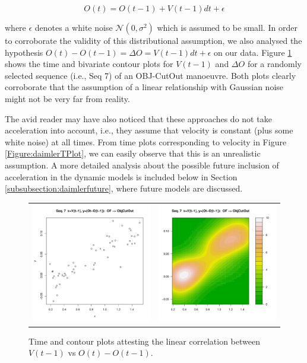 \begin{equation}
O(t) =O(t-1) +V(t-1)dt +\epsilon
\end{equation}

where $\epsilon$ denotes a white noise $\mathcal{N}(0,\sigma^2)$ which is assumed to be small. In order to corroborate the validity of this distributional assumption, we also analysed the hypothesis $O(t) - O(t-1) = \Delta O = V(t-1)dt +\epsilon$ on our data. Figure \ref{Figure:daimlerVvsOffs} shows the time and bivariate contour plots for $V(t-1)$ and $\Delta O$ for a randomly selected sequence (i.e., Seq 7) of an OBJ-CutOut manoeuvre. Both plots clearly corroborate that the assumption of a linear relationship with Gaussian noise might not be very far from reality.

The avid reader may have also noticed that these approaches do not take acceleration into account, i.e., they assume that velocity is constant (plus some white noise) at all times. From time plots corresponding to velocity in Figure \ref{Figure:daimlerTPlot}, we can easily observe that this is an unrealistic assumption. A more detailed analysis about the possible future inclusion of acceleration in the dynamic models is included below in Section \ref{subsubsection:daimlerfuture}, where future models are discussed.

\begin{figure}[ht!]
  \centering
  \setlength{\tabcolsep}{0.05pt}
  \renewcommand{\arraystretch}{0.02}
    \begin{tabular}{cc}
    \includegraphics[width=60mm]{figures/DaimlerOBJplotSerie7.pdf}&
    \includegraphics[width=60mm]{figures/DaimlerOBJcontourSerie7.pdf}\\
  \end{tabular}
      \caption{ \label{Figure:daimlerVvsOffs}Time and contour plots attesting the linear correlation between $V(t-1)$ vs $O(t) - O(t-1)$.}
\end{figure}

